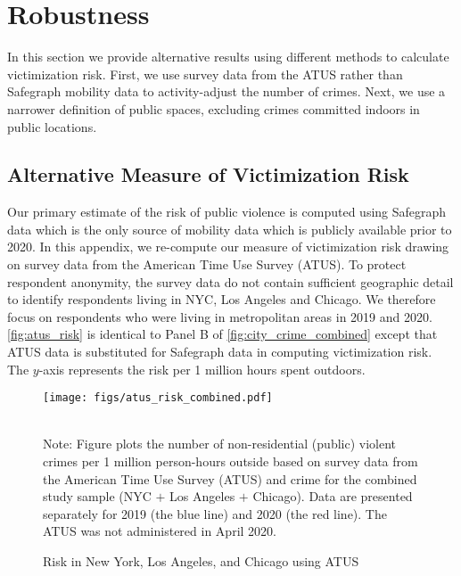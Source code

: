 \newpage
\clearpage
\section{Robustness} \label{sec:appendix1}
In this section we provide alternative results using different methods to calculate victimization risk. First, we use survey data from the ATUS rather than Safegraph mobility data to activity-adjust the number of crimes. Next, we use a narrower definition of public spaces, excluding crimes committed indoors in public locations.


\subsection{Alternative Measure of Victimization Risk}
Our primary estimate of the risk of public violence is computed using Safegraph data which is the only source of mobility data which is publicly available prior to 2020. In this appendix, we re-compute our measure of victimization risk drawing on survey data from the American Time Use Survey (ATUS). To protect respondent anonymity, the survey data do not contain sufficient geographic detail to identify respondents living in NYC, Los Angeles and Chicago. We therefore focus on respondents who were living in metropolitan areas in 2019 and 2020. \autoref{fig:atus_risk} is identical to Panel B of \autoref{fig:city_crime_combined} except that ATUS data is substituted for Safegraph data in computing victimization risk. The $y$-axis represents the risk per 1 million hours spent outdoors.

  \begin{figure}
    \begin{center}
    \texttt{[image: figs/atus\_risk\_combined.pdf]}
    \caption{Risk in New York, Los Angeles, and Chicago using ATUS}
    \label{fig:atus_risk}
    \end{center}
            \vspace*{0mm}  \\ 
        \newline 
Note: Figure plots the number of non-residential (public) violent crimes per 1 million person-hours outside based on survey data from the American Time Use Survey (ATUS) and crime for the combined study sample (NYC $+$ Los Angeles $+$ Chicago). Data are presented separately for 2019 (the blue line) and 2020 (the red line). The ATUS was not administered in April 2020.
\end{figure}



